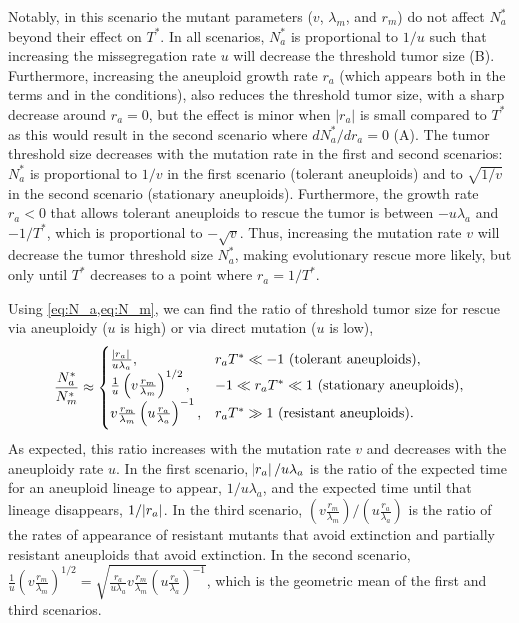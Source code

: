 \documentclass[12pt]{extarticle}
\renewcommand{\Delta}{r}
\begin{document}
Notably, in this scenario the mutant parameters ($v$, $\lambda_m$, and $\Delta_m$) do not affect $N_a^*$ beyond their effect on $T^*$.
In all scenarios, $N_a^*$ is proportional to $1/u$ such that increasing the missegregation rate $u$ will decrease the threshold tumor size (B).
Furthermore, increasing the aneuploid growth rate $\Delta_a$ (which appears both in the terms and in the conditions), also reduces the threshold tumor size, with a sharp decrease around $\Delta_a=0$, but the effect is minor when $|\Delta_a|$ is small compared to $T^*$ as this would result in the second scenario where  $dN_a^*/d\Delta_a=0$ (A). 
The tumor threshold size decreases with the mutation rate in the first and second scenarios: $N_a^*$ is proportional to $1/v$ in the first scenario (tolerant aneuploids) and to $\sqrt{1/v}$ in the second scenario (stationary aneuploids). Furthermore, the growth rate $\Delta_a<0$ that allows tolerant aneuploids to rescue the tumor is between $-u\lambda_a$ and  $-1/T^*$, which is proportional to $-\sqrt{v}$. Thus, increasing the mutation rate $v$ will decrease the tumor threshold size $N^*_a$, making evolutionary rescue more likely, but only until $T^*$ decreases to a point where  $\Delta_a =1/T^*$. %

Using \cref{eq:N_a,eq:N_m}, we can find the ratio of threshold tumor size for rescue via aneuploidy ($u$ is high) or via direct mutation ($u$ is low),
\begin{equation} \label{eq:N_ratio}
\frac{N^*_a}{N^*_m} \approx \begin{cases}
    \frac{\abs{\Delta_a}}{u\lambda_a} ,&
  \Delta_a T^* \ll -1 \text{ (tolerant aneuploids)} ,\\ 
  \frac{1}{u}\left(v  \frac{\Delta_m}{\lambda_m}\right)^{1/2} ,&
  -1 \ll \Delta_a T^* \ll 1 \text{ (stationary aneuploids)} ,\\ 
  v \frac{\Delta_m}{\lambda_m}  \left(u\frac{\Delta_a}{\lambda_a}\right)^{-1}  ,&
   \Delta_a T^* \gg 1 \text{ (resistant aneuploids)} .
  \end{cases}
\end{equation}
As expected, this ratio increases with the mutation rate $v$ and decreases with the aneuploidy rate $u$.
In the first scenario, $\abs{\Delta_a}/u\lambda_a$ is the ratio of the expected time for an aneuploid lineage to appear, $1/u\lambda_a$, and the expected time until that lineage disappears, $1/\abs{\Delta_a}$.
In the third scenario, $\left(v \frac{\Delta_m}{\lambda_m}\right) / \left(u \frac{\Delta_a}{\lambda_a}\right)$ is the ratio of the rates of appearance of resistant mutants that avoid extinction and partially resistant aneuploids that avoid extinction.
In the second scenario, $\frac{1}{u}\left(v  \frac{\Delta_m}{\lambda_m}\right)^{1/2}=\sqrt{\frac{\Delta_a}{u\lambda_a}  v \frac{\Delta_m}{\lambda_m}  \left(u\frac{\Delta_a}{\lambda_a}\right)^{-1}}$, which is the geometric mean of the first and third scenarios.
\end{document}
